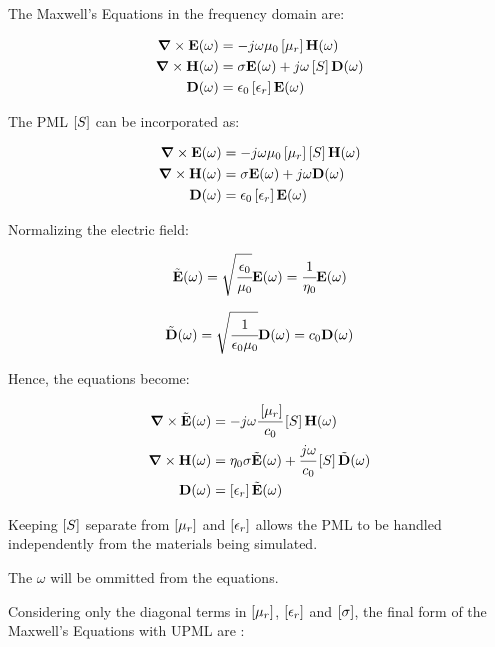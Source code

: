 The Maxwell's Equations in the frequency domain are:

\begin{align}
    \rot \E (\omega) &= -j\omega \mu_0 \brackets{\mu_r} \Hh (\omega) \\
    \rot \Hh (\omega) &= \sigma \E(\omega) + j\omega\brackets{S} \D (\omega) \\
    \D (\omega) &= \epsilon_0 \brackets{\epsilon _r}\E (\omega)
\end{align}

The PML $\brackets{S}$ can be incorporated as:

\begin{align}
    \rot \E (\omega) &= -j\omega \mu_0 \brackets{\mu_r} \brackets{S} \Hh (\omega) \\
    \rot \Hh (\omega) &= \sigma \E(\omega) + j\omega \D (\omega) \\
    \D (\omega) &= \epsilon_0 \brackets{\epsilon _r} \E (\omega)
\end{align}

Normalizing the electric field:

\begin{equation}
    \tilde{\textbf{E}}(\omega) = \sqrt{\cfrac{\epsilon_0}{\mu_0}}\textbf{E}(\omega) = \cfrac{1}{\eta_0}\textbf{E}(\omega)
\end{equation}

\begin{equation}
    \tilde{\textbf{D}}(\omega) = \sqrt{\cfrac{1}{\epsilon_0\mu_0}} \textbf{D}(\omega) = c_0 \textbf{D}(\omega)
\end{equation}

Hence, the equations become:

\begin{align}
    \rot \Enw (\omega) &= -j\omega\cfrac{\brackets{\mu_r}}{c_0} \brackets{S} \Hh (\omega) \\
    \rot \Hh (\omega) &= \eta_0 \sigma \Enw(\omega) + \cfrac{j\omega}{c_0}\brackets{S} \Dnw (\omega) \\
    \D (\omega) &= \brackets{\epsilon _r} \Enw (\omega)
\end{align}

Keeping $\brackets{S}$ separate from $\brackets{\mu_r}$ and $\brackets{\epsilon_r}$ allows the PML to be handled independently from the materials being simulated.

The $\omega$ will be ommitted from the equations.

Considering only the diagonal terms in $\brackets{\mu_r}$, $\brackets{\epsilon_r}$ and $\brackets{\sigma}$, the final form of the Maxwell's Equations with UPML are \cite{empossible_3d_pml}:

